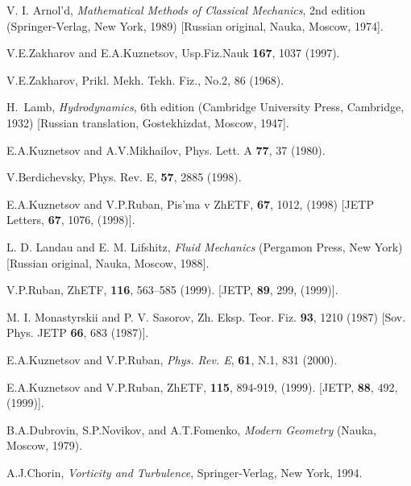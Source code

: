 \begin{thebibliography}{99}

  V. I. Arnol'd, {\it Mathematical Methods of Classical
Mechanics}, 2nd edition (Springer-Verlag, New York, 1989) [Russian original,
Nauka, Moscow, 1974].

 V.E.Zakharov and E.A.Kuznetsov, Usp.Fiz.Nauk {\bf 167}, 
1037 (1997).

 V.E.Zakharov, Prikl. Mekh. Tekh. Fiz., No.2, 86 (1968).

  H.\ Lamb, {\it Hydrodynamics}, 6th edition (Cambridge
University Press, Cambridge, 1932) [Russian translation, Gostekhizdat,
Moscow, 1947].

 E.A.Kuznetsov and A.V.Mikhailov, Phys. Lett. A {\bf 77}, 
37 (1980).

 V.Berdichevsky, Phys. Rev. E, {\bf 57}, 2885 (1998).

E.A.Kuznetsov and V.P.Ruban, Pis'ma v ZhETF, {\bf 67}, 1012, (1998)
[JETP Letters, {\bf 67}, 1076, (1998)].

  L. D. Landau and E. M. Lifshitz, {\it Fluid Mechanics}
(Pergamon Press, New York) [Russian original, Nauka, Moscow, 1988].

 V.P.Ruban, ZhETF, {\bf 116}, 563--585 (1999).
[JETP, {\bf 89}, 299, (1999)].

  M. I. Monastyrskii and P. V. Sasorov, Zh. Eksp.
Teor. Fiz. {\bf 93}, 1210 (1987) [Sov. Phys. JETP {\bf 66}, 683 (1987)].

 E.A.Kuznetsov and V.P.Ruban, {\it Phys. Rev. E},
{\bf 61}, N.1, 831 (2000).

E.A.Kuznetsov and V.P.Ruban, ZhETF, {\bf 115}, 894-919, (1999).
[JETP, {\bf 88}, 492, (1999)].

 B.A.Dubrovin, S.P.Novikov, and A.T.Fomenko,
{\it Modern Geometry} (Nauka, Moscow, 1979).

 A.J.Chorin, {\it Vorticity and Turbulence}, Springer-Verlag,
New York, 1994.

\end{thebibliography}


